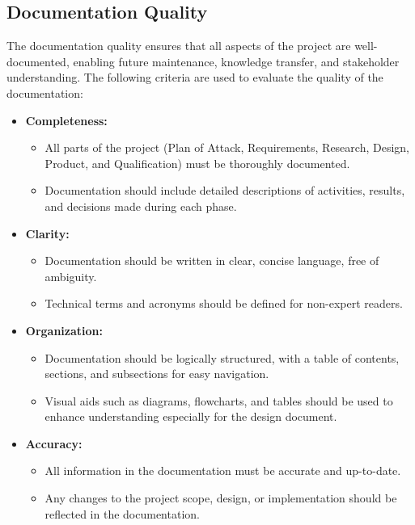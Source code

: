 \documentclass{article}
\begin{document}
\subsection{Documentation Quality}
The documentation quality ensures that all aspects of the project are well-documented, enabling future maintenance, knowledge transfer, and stakeholder understanding. The following criteria are used to evaluate the quality of the documentation:

\begin{itemize}[leftmargin=*, label={}]
    \item \textbf{Completeness:}
        \begin{itemize}
            \item All parts of the project (Plan of Attack, Requirements, Research, Design, Product, and Qualification) must be thoroughly documented.
            \item Documentation should include detailed descriptions of activities, results, and decisions made during each phase.
        \end{itemize}
    \item \textbf{Clarity:}
        \begin{itemize}
            \item Documentation should be written in clear, concise language, free of ambiguity.
            \item Technical terms and acronyms should be defined for non-expert readers.
        \end{itemize}
    \item \textbf{Organization:}
        \begin{itemize}
            \item Documentation should be logically structured, with a table of contents, sections, and subsections for easy navigation.
            \item Visual aids such as diagrams, flowcharts, and tables should be used to enhance understanding especially for the design document.
        \end{itemize}
    \item \textbf{Accuracy:}
        \begin{itemize}
            \item All information in the documentation must be accurate and up-to-date.
            \item Any changes to the project scope, design, or implementation should be reflected in the documentation.
        \end{itemize}

\end{itemize}
\end{document}
